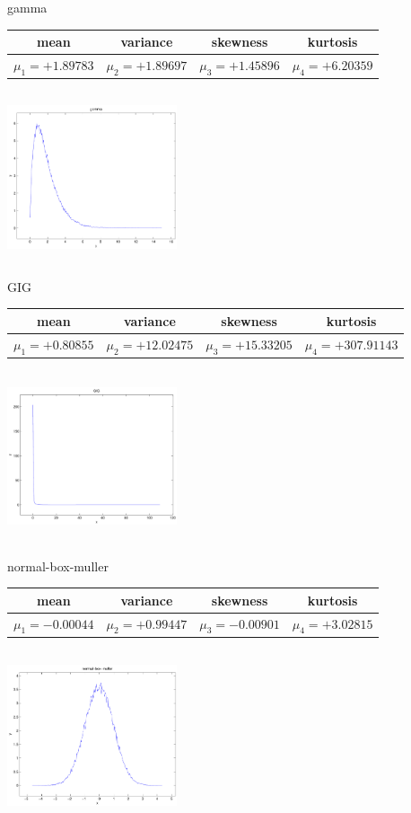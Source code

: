 \documentclass[9pt]{article}
\theoremstyle{plain}
\theoremstyle{definition}
\theoremstyle{remark}
\numberwithin{equation}{section}
\begin{document}
\newpage
gamma \begin{tabular}{|c|c|c|c|}  mean & variance & skewness & kurtosis \\  \hline
$\mu_1 = +1.89783$ & $\mu_2 = +1.89697$ & $\mu_3 = +1.45896$ & $\mu_4 =+6.20359$ \\
\end{tabular}

\includegraphics[width=5cm,height=5cm]{gamma.pdf}

GIG \begin{tabular}{|c|c|c|c|}  mean & variance & skewness & kurtosis \\  \hline
$\mu_1 = +0.80855$ & $\mu_2 = +12.02475$ & $\mu_3 = +15.33205$ & $\mu_4 =+307.91143$ \\
\end{tabular}

\includegraphics[width=5cm,height=5cm]{GIG.pdf}

normal-box-muller \begin{tabular}{|c|c|c|c|}  mean & variance & skewness & kurtosis \\  \hline
$\mu_1 = -0.00044$ & $\mu_2 = +0.99447$ & $\mu_3 = -0.00901$ & $\mu_4 =+3.02815$ \\
\end{tabular}

\includegraphics[width=5cm,height=5cm]{normal-box-muller.pdf}
\end{document}
